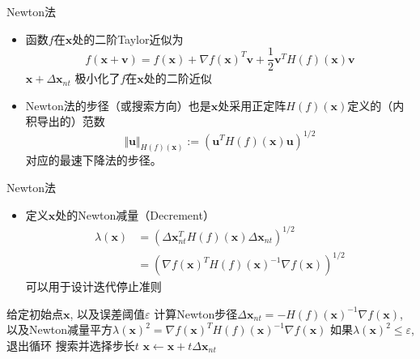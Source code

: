 \begin{frame}

\begin{block}{Newton法}
\begin{itemize}
\item 函数$f$在$\mathbf{x}$处的二阶Taylor近似为
\[f(\mathbf{x} + \mathbf{v}) = f(\mathbf{x}) + \nabla f(\mathbf{x})^T \mathbf{v} + \dfrac{1}{2} \mathbf{v}^T H(f)(\mathbf{x}) \mathbf{v}\]
$\mathbf{x} + \Delta \mathbf{x}_{nt}$ 极小化了$f$在$\mathbf{x}$处的二阶近似
\vspace{1em}
\item Newton法的步径（或搜索方向）也是$\mathbf{x}$处采用正定阵$H(f)(\mathbf{x})$定义的（内积导出的）范数
\[\Vert \mathbf{u} \Vert_{H(f)(\mathbf{x})} := (\mathbf{u}^T H(f)(\mathbf{x}) \mathbf{u})^{1/2}\]
对应的最速下降法的步径。
\end{itemize}
\end{block}

\end{frame}


\begin{frame}

\begin{block}{Newton法}
\begin{itemize}
\item 定义$\mathbf{x}$处的Newton减量（Decrement）
\begin{align*}
\lambda(\mathbf{x}) & = (\Delta \mathbf{x}_{nt}^T H(f)(\mathbf{x}) \Delta \mathbf{x}_{nt})^{1/2} \\
& = (\nabla f(\mathbf{x})^T H(f)(\mathbf{x})^{-1} \nabla f(\mathbf{x}))^{1/2}
\end{align*}
可以用于设计迭代停止准则
\end{itemize}
\end{block}

\end{frame}


\begin{frame}

\begin{algorithm}[H]
\SetAlgoLined
\DontPrintSemicolon
{}

给定初始点$\mathbf{x}$, 以及误差阈值$\varepsilon$ \;
{
计算Newton步径$\Delta \mathbf{x}_{nt} = - H(f)(\mathbf{x})^{-1} \nabla f(\mathbf{x})$, 以及Newton减量平方$\lambda(\mathbf{x})^2 = \nabla f(\mathbf{x})^T H(f)(\mathbf{x})^{-1} \nabla f(\mathbf{x})$\;
如果$\lambda(\mathbf{x})^2 \le \varepsilon$, 退出循环 \;
搜索并选择步长$t$ \;
$ \mathbf{x} \gets \mathbf{x} + t \Delta \mathbf{x}_{nt}$ \;
}
\caption{Newton法}
\end{algorithm}

\end{frame}

